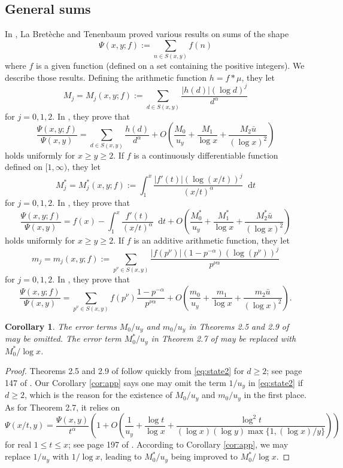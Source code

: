 \documentclass{amsart}
\theoremstyle{plain}
\newtheorem{cor}[thm]{Corollary}
\theoremstyle{remark}
\newcommand*\diff{\mathop{}\!\mathrm{d}}
\newcommand{\ubar}{\bar{u}}
\begin{document}
\subsection{General sums}
In \cite{DLBT20052}, La Bret\`eche and Tenenbaum proved various results on sums of the shape
\[ \Psi(x,y;f):=\sum_{n \in S(x,y)} f(n) \]
where $f$ is a given function (defined on a set containing the positive integers). We describe those results. Defining the arithmetic function $h=f*\mu$, they let
\[ M_j = M_j(x,y;f):= \sum_{d \in S(x,y)} \frac{|h(d)|(\log d)^j}{d^{\alpha}}\]
for $j=0,1,2$. In \cite[Thm.~2.5]{DLBT20052}, they prove that
\[ \frac{\Psi(x,y;f)}{\Psi(x,y)}=\sum_{d \in S(x,y)} \frac{h(d)}{d^{\alpha}} + O\left(\frac{M_0}{u_y}+\frac{M_1}{\log x}+\frac{M_2 \ubar}{(\log x)^2}\right)\]
holds uniformly for $x \ge y \ge 2$. 
If $f$ is a continuously differentiable function defined on  $[1,\infty)$, they let
\[ M_j^*=M_j^*(x,y;f):=\int_{1}^{x} \frac{|f'(t)|(\log (x/t))^j}{(x/t)^{\alpha}}\diff{t}\]
for $j=0,1,2$. In \cite[Thm.~2.7]{DLBT20052}, they prove that
\begin{equation}\label{eq:thm27}
	\frac{\Psi(x,y;f)}{\Psi(x,y)}= f(x)-\int_{1}^{x} \frac{f'(t)}{(x/t)^{\alpha}}\diff{t} +O\left(\frac{M_0^*}{u_y}+\frac{M_1^*}{\log x}+\frac{M_2^* \ubar}{(\log x)^2}\right)
\end{equation}
holds uniformly for $x \ge y \ge 2$. If $f$ is an additive arithmetic function, they let
\[ m_j=m_j(x,y;f):=\sum_{p^{\nu}\in S(x,y)} \frac{|f(p^{\nu})|(1-p^{-\alpha})(\log (p^{\nu}))^j}{p^{\nu \alpha}}\]
for $j=0,1,2$. In \cite[Thm.~2.9]{DLBT20052}, they prove that
\[	\frac{\Psi(x,y;f)}{\Psi(x,y)}= \sum_{p^{\nu} \in S(x,y)}f(p^{\nu}) \frac{1-p^{-\alpha}}{p^{\nu\alpha}} + O\left(\frac{m_0}{u_y}+\frac{m_1}{\log x}+\frac{m_2 \ubar}{(\log x)^2}\right). \]
\begin{cor}\label{cor:M0remove}
	The error terms $M_0/u_y$ and $m_0/u_y$ in Theorems 2.5 and 2.9 of \cite{DLBT20052} may be omitted. The error term $M_0^*/u_y$ in Theorem 2.7 of \cite{DLBT20052} may be replaced with  $M_0^*/\log x $.
\end{cor}
\begin{proof}
	Theorems 2.5 and 2.9 of \cite{DLBT20052} follow quickly from \eqref{eq:state2} for $d \ge 2$; see page 147 of \cite{DLBT20052}. Our Corollary \ref{cor:app} says one may omit the term $1/u_y$ in \eqref{eq:state2} if $d \ge 2$, which is the reason for the existence of $M_0/u_y$ and $m_0/u_y$ in the first place. As for Theorem 2.7, it relies on 
	\[ \Psi(x/t,y)=\frac{\Psi(x,y)}{t^{\alpha}}\left(1+ O\left( \frac{1}{u_y} + \frac{\log t}{\log x} + \frac{ \log^2 t}{(\log x )(\log y) \max\{1,(\log x)/y\}}\right)\right)\] 
	for real $1 \le t \le x$; see page 197 of \cite{DLBT20052}.
	According to Corollary \ref{cor:app}, we may replace $1/u_y$ with $1/\log x$, leading to $M_0^*/u_y$ being improved to $M_0^*/\log x$.
\end{proof}
\end{document}
